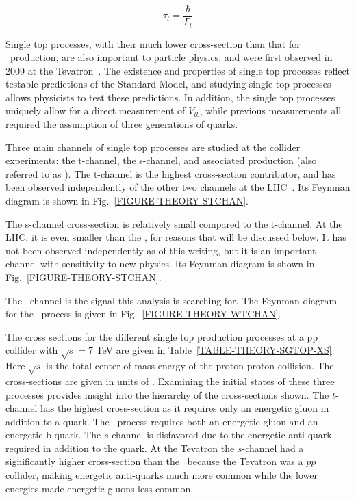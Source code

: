 \begin{equation}
\label{EQUATION-THEORY-LIFETIME}
\tau_{t} = \frac{\hbar}{\Gamma_{t}}
\end{equation}

\noindent
Single top processes, with their much lower cross-section than that for \TTbar\ production, are also important to particle physics, and were first observed in 2009 at the Tevatron~\cite{SGTOP-D0}. The existence and properties of single top processes reflect testable predictions of the Standard Model, and studying single top processes allows physicists to test these predictions. In addition, the single top processes uniquely allow for a direct measurement of $V_{tb}$, while previous measurements all required the assumption of three generations of quarks. 

Three main channels of single top processes are studied at the collider experiments: the t-channel, the s-channel, and associated production (also referred to as \Wtchan). The t-channel is the highest cross-section contributor, and has been observed independently of the other two channels at the LHC~\cite{TCHAN-ATLAS}. Its Feynman diagram is shown in Fig.~\ref{FIGURE-THEORY-STCHAN}. 

The s-channel cross-section is relatively small compared to the t-channel. At the LHC, it is even smaller than the \Wtchan, for reasons that will be discussed below. It has not been observed independently as of this writing, but it is an important channel with sensitivity to new physics. Its Feynman diagram is shown in Fig.~\ref{FIGURE-THEORY-STCHAN}.

The \Wtchan\ channel is the signal this analysis is searching for. The Feynman diagram for the \Wtchan\ process is given in Fig.~\ref{FIGURE-THEORY-WTCHAN}. 

The cross sections for the different single top production processes at a pp collider with $\sqrt{s}=7$ TeV are given in Table~\ref{TABLE-THEORY-SGTOP-XS}. Here $\sqrt{s}$ is the total center of mass energy of the proton-proton collision. The cross-sections are given in units of \pb. Examining the initial states of these three processes provides insight into the hierarchy of the cross-sections shown. The $t$-channel has the highest cross-section as it requires only an energetic gluon in addition to a quark. The \Wtchan\ process requires both an energetic gluon and an energetic b-quark. The $s$-channel is disfavored due to the energetic anti-quark required in addition to the quark. At the Tevatron the $s$-channel had a significantly higher cross-section than the \Wtchan\ because the Tevatron was a $p\bar{p}$ collider, making energetic anti-quarks much more common while the lower energies made energetic gluons less common. 

